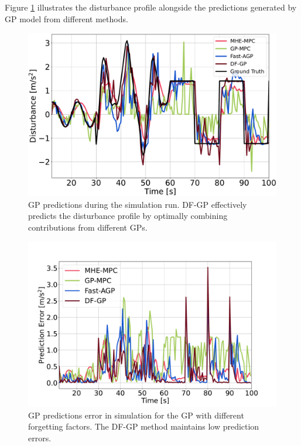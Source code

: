  Figure \ref{fig:prediction} illustrates the disturbance profile alongside the predictions generated by GP model from different methods. 
 \begin{figure}[t]
	\centering	\includegraphics[width=0.95\linewidth]{figures/Simulations/pred_mhe.pdf}
	\caption{\ac{GP} predictions during the simulation run. \ac{DF-GP} effectively predicts the disturbance profile by optimally combining contributions from different \ac{GP}s.}
	\label{fig:prediction}
\end{figure}
%
\begin{figure}[b]
	\centering	\includegraphics[width=1\linewidth]{figures/Simulations/pred_err_mhe.pdf}
	\caption{\ac{GP} predictions error in simulation for the \ac{GP} with different forgetting factors. The \ac{DF-GP} method maintains low prediction errors. }
	\label{fig:pred_error}
\end{figure}
